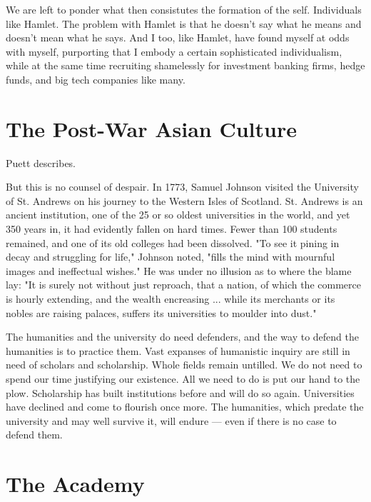 \documentclass[12pt,letterpaper]{article}
\begin{document}
We are left to ponder what then consistutes the formation of the self.  Individuals like Hamlet.  The problem with Hamlet is that he doesn't say what he means and doesn't mean what he says.  And I too, like Hamlet, have found myself at odds with myself, purporting that I embody a certain sophisticated individualism, while at the same time recruiting shamelessly for investment banking firms, hedge funds, and big tech companies like many.


\section{The Post-War Asian Culture}
Puett describes.  

But this is no counsel of despair. In 1773, Samuel Johnson visited the University of St. Andrews on his journey to the Western Isles of Scotland. St. Andrews is an ancient institution, one of the 25 or so oldest universities in the world, and yet 350 years in, it had evidently fallen on hard times. Fewer than 100 students remained, and one of its old colleges had been dissolved. "To see it pining in decay and struggling for life," Johnson noted, "fills the mind with mournful images and ineffectual wishes." He was under no illusion as to where the blame lay: "It is surely not without just reproach, that a nation, of which the commerce is hourly extending, and the wealth encreasing ... while its merchants or its nobles are raising palaces, suffers its universities to moulder into dust."

The humanities and the university do need defenders, and the way to defend the humanities is to practice them. Vast expanses of humanistic inquiry are still in need of scholars and scholarship. Whole fields remain untilled. We do not need to spend our time justifying our existence. All we need to do is put our hand to the plow. Scholarship has built institutions before and will do so again. Universities have declined and come to flourish once more. The humanities, which predate the university and may well survive it, will endure — even if there is no case to defend them.




\section{The Academy}
\end{document}
